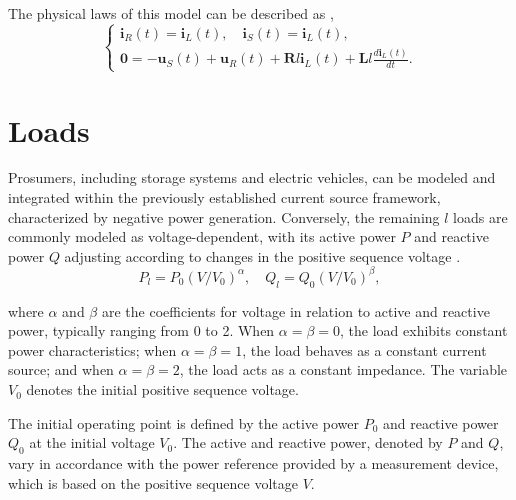 The physical laws of this model can be described as \autocite{8811599},
\begin{equation}
    \left\{\begin{array}{c}
        \displaystyle \mathbf{i}_{R}(t)=\mathbf{i}_{L}(t), \quad \mathbf{i}_{S}(t)=\mathbf{i}_{L}(t), \\[1em]
        \displaystyle \mathbf{0}=-\mathbf{u}_{S}(t)+\mathbf{u}_{R}(t)+\mathbf{R} l \mathbf{i}_{L}(t)+\mathbf{L} l \frac{d \mathbf{i}_{L}(t)}{d t}.
    \end{array}\right.
\end{equation}



\section{Loads}\label{sec:ch3/sec4}
Prosumers, including storage systems and electric vehicles, can be modeled and integrated within the previously established current source framework, characterized by negative power generation. Conversely, the remaining $l$ loads are commonly modeled as voltage-dependent, with its active power $P$ and reactive power $Q$ adjusting according to changes in the positive sequence voltage \autocite{9369128}.
\begin{equation}\label{eq:pq_l}
    P_l = P_0(V/V_0)^\alpha, \quad Q_l = Q_0(V/V_0)^\beta,
\end{equation}

\noindent where $\alpha$ and $\beta$ are the coefficients for voltage in relation to active and reactive power, typically ranging from 0 to 2. When $\alpha = \beta = 0$, the load exhibits constant power characteristics; when $\alpha = \beta = 1$, the load behaves as a constant current source; and when $\alpha = \beta = 2$, the load acts as a constant impedance. The variable $V_0$ denotes the initial positive sequence voltage.

The initial operating point is defined by the active power $P_0$ and reactive power $Q_0$ at the initial voltage $V_0$. The active and reactive power, denoted by $P$ and $Q$, vary in accordance with the power reference provided by a measurement device, which is based on the positive sequence voltage $V$.

